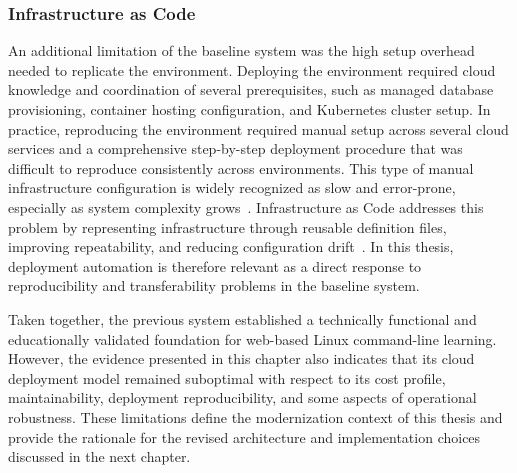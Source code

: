 \subsubsection{Infrastructure as Code} \label{subsubsec:infrastructure-as-code}
An additional limitation of the baseline system was the high setup overhead needed to replicate the environment.
Deploying the environment required cloud knowledge and coordination of several prerequisites, such as managed database provisioning, container hosting configuration, and Kubernetes cluster setup.
In practice, reproducing the environment required manual setup across several cloud services and a comprehensive step-by-step deployment procedure that was difficult to reproduce consistently across environments.
This type of manual infrastructure configuration is widely recognized as slow and error-prone, especially as system complexity grows~\cite{guerriero_adoption_2019}.
Infrastructure as Code addresses this problem by representing infrastructure through reusable definition files, improving repeatability, and reducing configuration drift~\cite{guerriero_adoption_2019,bali_enhancing_2023}.
In this thesis, deployment automation is therefore relevant as a direct response to reproducibility and transferability problems in the baseline system.

Taken together, the previous system established a technically functional and educationally validated foundation for web-based Linux command-line learning.
However, the evidence presented in this chapter also indicates that its cloud deployment model remained suboptimal with respect to its cost profile, maintainability, deployment reproducibility, and some aspects of operational robustness.
These limitations define the modernization context of this thesis and provide the rationale for the revised architecture and implementation choices discussed in the next chapter.
